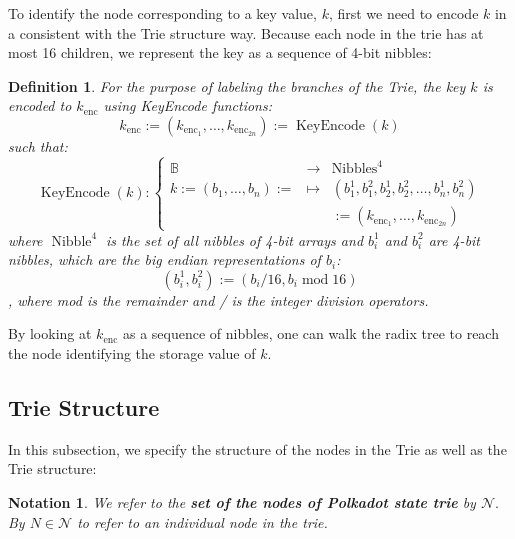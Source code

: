 \documentclass{book}
\newcommand{\assign}{:=}
\newcommand{\nosymbol}{}
\newcommand{\tmop}[1]{\ensuremath{\operatorname{#1}}}
\newcommand{\tmstrong}[1]{\textbf{#1}}
\newcommand{\tmtextbf}[1]{{\bfseries{#1}}}
\newtheorem{definition}{Definition}
\newtheorem{notation}{Notation}
\providecommand{\nosymbol}{}
\providecommand{\tmop}[1]{\ensuremath{\mathrm{#1}}}
\providecommand{\tmstrong}[1]{\tmtextbf{#1}}
\providecommand{\tmtextbf}[1]{\tmtextbf{#1}}
\newtheorem{definition}{Definition}
\newtheorem{notation}{Notation}
\begin{document}
To identify the node corresponding to a key value, $k$, first we need to
encode $k$ in a consistent with the Trie structure way. Because each node in
the trie has at most 16 children, we represent the key as a sequence of 4-bit
nibbles:

\begin{definition}
  For the purpose of labeling the branches of the Trie, the key $k$ is encoded
  to $k_{\tmop{enc}}$ using KeyEncode functions:
  \begin{equation}
    k_{\tmop{enc}} \assign (k_{\tmop{enc}_1}, \ldots, k_{\tmop{enc}_{2 n}})
    \assign \tmop{KeyEncode} (k) \label{key-encode-in-trie}
  \end{equation}
  such that:
  \[ \tmop{KeyEncode} (k) : \left\{ \begin{array}{lll}
       \mathbb{B}^{\nosymbol} & \rightarrow & \tmop{Nibbles}^4\\
       k \assign (b_1, \ldots, b_n) \assign & \mapsto & (b^1_1, b^2_1, b_2^1,
       b^2_2, \ldots, b^1_n, b^2_n)\\
       &  & \assign (k_{\tmop{enc}_1}, \ldots, k_{\tmop{enc}_{2 n}})
     \end{array} \right. \]
  where $\tmop{Nibble}^4$ is the set of all nibbles of 4-bit arrays and
  $b^1_i$ and $b^2_i$ are 4-bit nibbles, which are the big endian
  representations of $b_i$:
  \[ (b^1_i, b^2_i) \assign (b_i / 16, b_i \tmop{mod} 16) \]
  , where mod is the remainder and / is the integer division operators.
\end{definition}

By looking at $k_{\tmop{enc}}$ as a sequence of nibbles, one can walk the
radix tree to reach the node identifying the storage value of $k$.

\subsection{Trie Structure}\label{sect-state-storage-trie-structure}

In this subsection, we specify the structure of the nodes in the Trie as well
as the Trie structure:

\begin{notation}
  We refer to the {\tmstrong{set of the nodes of Polkadot state trie}} by
  $\mathcal{N}.$ By $N \in \mathcal{N}$ to refer to an individual node in the
  trie.
\end{notation}
\end{document}
